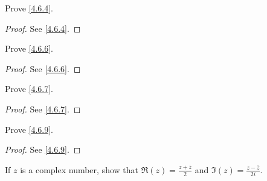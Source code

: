 \exercisesection

\begin{ex}\label{ex:4.6.1}
  Prove \cref{4.6.4}.
\end{ex}

\begin{proof}
  See \cref{4.6.4}.
\end{proof}

\begin{ex}\label{ex:4.6.2}
  Prove \cref{4.6.6}.
\end{ex}

\begin{proof}
  See \cref{4.6.6}.
\end{proof}

\begin{ex}\label{ex:4.6.3}
  Prove \cref{4.6.7}.
\end{ex}

\begin{proof}
  See \cref{4.6.7}.
\end{proof}

\begin{ex}\label{ex:4.6.4}
  Prove \cref{4.6.9}.
\end{ex}

\begin{proof}
  See \cref{4.6.9}.
\end{proof}

\begin{ex}\label{ex:4.6.5}
  If \(z\) is a complex number, show that \(\Re(z) = \frac{z + \overline{z}}{2}\) and \(\Im(z) = \frac{z - \overline{z}}{2i}\).
\end{ex}

